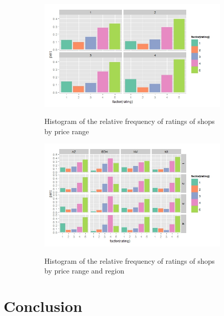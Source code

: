 \documentclass[11pt]{article}
\begin{document}
\begin{figure}
\centering
\begin{subfigure}{.5\textwidth}
	\centering
           \caption{Histogram of the relative frequency of ratings of shops by price range}
	\includegraphics[width=1\textwidth]{Figures/shopping1.jpeg}
           \label{shopping1}
\end{subfigure}
\begin{subfigure}{.5\textwidth}
	\centering
           \caption{Histogram of the relative frequency of ratings of shops by price range and region}
	\includegraphics[width=1\textwidth]{Figures/shopping2.jpeg}
           \label{shopping2}
\end{subfigure}
\caption{}
\label{}
\end{figure}


\section{Conclusion}
\end{document}
